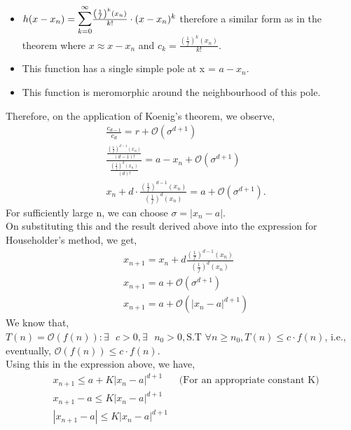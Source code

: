 \documentclass[letterpaper]{exam}
\begin{document}
\begin{questions}
\begin{solution}
\begin{itemize}
    \item $h(x-x_n) = \overset{\infty}{\underset{k = 0}{\mathlarger{\mathlarger{\sum}}}} \frac{\left(\frac{1}{f}\right)^k(x_n)}{k!}\cdot(x-x_n)^k $ therefore a similar form as in the theorem where $x \approx x-x_n$ and $c_k = \frac{\left(\frac{1}{f}\right)^k(x_n)}{k!}$.
    \item This function has a single simple pole at x = $a-x_n$.
    \item This function is meromorphic around the neighbourhood of this pole.
\end{itemize}
Therefore, on the application of Koenig's theorem, we observe,
\begin{align*}
    &\frac{c_{d-1}}{c_d} = r + \mathcal{O}\left(\sigma^{d+1}\right)\\
    &\frac{\frac{\left(\frac{1}{f}\right)^{d-1}(x_n)}{(d-1)!}}{\frac{\left(\frac{1}{f}\right)^{d}(x_n)}{(d)!}} = a - x_n + \mathcal{O}\left(\sigma^{d+1}\right)\\
    & x_n + d\cdot \frac{\left(\frac{1}{f}\right)^{d-1}(x_n)}{\left(\frac{1}{f}\right)^{d}(x_n)} = a + \mathcal{O}\left(\sigma^{d+1}\right).
\end{align*}
For sufficiently large n, we can choose $\sigma = \left|x_n - a\right|$. \\
On substituting this and the result derived above into the expression for Householder's method, we get,
\begin{align*}
    &x_{n+1} = x_n + d\frac{\left(\frac{1}{f}\right)^{d-1}(x_n)}{\left(\frac{1}{f}\right)^{d}(x_n)}\\
    &x_{n+1} = a + \mathcal{O}\left(\sigma^{d+1}\right)\\
    &x_{n+1} = a + \mathcal{O}\left(\left|x_n - a\right|^{d+1}\right)
\end{align*}
We know that, $T(n) = \mathcal{O}\left(f(n)\right) : \exists \mbox{ } c > 0,\exists \mbox{ }  n_0 > 0, \text{S.T } \forall n \geq n_0, T(n) \leq c\cdot f(n)$, i.e., eventually, $\mathcal{O}\left(f(n)\right) \leq c\cdot f(n)$.\\
Using this in the expression above, we have,
\begin{align*}
    &x_{n+1} \leq a + K\left|x_n - a\right|^{d+1} &\mbox{ (For an appropriate constant K)}\\
    &x_{n+1} - a \leq K\left|x_n - a\right|^{d+1}\\
    &\left|x_{n+1} - a\right| \leq K\left|x_n - a\right|^{d+1}\\

\end{align*}
\end{solution}
\end{questions}
\end{document}
